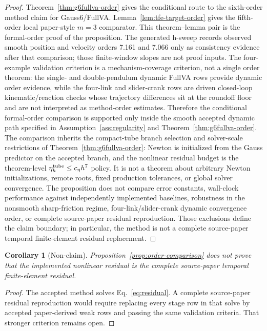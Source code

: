 \documentclass[preprint,12pt]{elsarticle}
\newtheorem{corollary}{Corollary}
\newcommand{\method}{Gauss6\slash FullVA}
\begin{document}
\begin{proof}
Theorem~\ref{thm:g6fullva-order} gives the conditional route to the
sixth-order method claim for \method{}. Lemma~\ref{lem:tfe-target-order}
gives the fifth-order local
paper-style $m=3$ comparator. This theorem--lemma pair is the formal-order
proof of the proposition. The generated h-sweep records observed smooth
position and velocity orders 7.161 and 7.066 only as consistency evidence
after that comparison; those finite-window slopes are not proof inputs. The
four-example validation criterion is a mechanism-coverage criterion, not a single order
theorem: the single- and
double-pendulum dynamic FullVA rows provide dynamic order evidence, while the
four-link and slider-crank rows are driven closed-loop kinematic/reaction
checks whose trajectory differences sit at the roundoff floor and are not
interpreted as method-order estimates. Therefore the conditional formal-order
comparison is supported only inside the smooth accepted dynamic path specified
in Assumption~\ref{ass:regularity} and Theorem~\ref{thm:g6fullva-order}. The
comparison inherits the compact-tube branch selection and solver-scale
restrictions of Theorem~\ref{thm:g6fullva-order}: Newton is initialized from
the Gauss predictor on the accepted branch, and the nonlinear residual budget
is the theorem-level \(\eta_h^{\rm tube}\le c_\eta h^7\) policy. It is not a
theorem about arbitrary Newton initializations, remote roots, fixed production
tolerances, or global solver convergence. The proposition does not compare
error constants, wall-clock performance against independently implemented
baselines, robustness in the nonsmooth sharp-friction regime,
four-link/slider-crank dynamic convergence order, or complete source-paper
residual reproduction. Those exclusions define the claim boundary; in
particular, the method is not a complete source-paper temporal finite-element
residual replacement.
\end{proof}

\begin{corollary}[Non-claim]
Proposition~\ref{prop:order-comparison} does not prove that the implemented
nonlinear residual is the complete source-paper temporal finite-element
residual.
\end{corollary}

\begin{proof}
The accepted method solves Eq.~\eqref{eq:residual}. A complete source-paper
residual reproduction would require replacing every stage row in that solve by
accepted paper-derived weak rows and passing the same validation criteria.
That stronger criterion remains open.
\end{proof}
\end{document}
